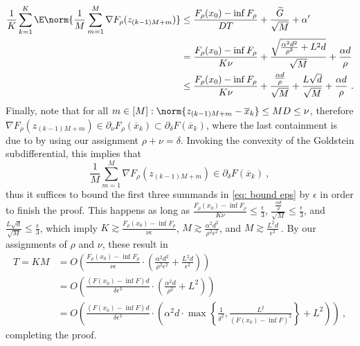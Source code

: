 \begin{align}
\frac{1}{K}\sum_{k=1}^{K}\E\norm{\frac{1}{M}\sum_{m=1}^{M}\nabla F_{\rho}(z_{(k-1)M+m})}
&\leq \frac{ F_\rho(x_0)-\inf F_\rho}{DT}+\frac{\widetilde{G}}{\sqrt{M}}+\alpha'
\nonumber\\
&=\frac{ F_\rho(x_0)-\inf F_\rho}{K\nu}+\frac{\sqrt{\frac{\alpha^2 d^2}{\rho^2}+L^2d}}{\sqrt{M}}+\frac{\alpha d}{\rho}  
\nonumber\\
&\leq
\frac{ F_\rho(x_0)-\inf F_\rho}{K\nu}
+\frac{{\frac{\alpha d}{\rho}}}{\sqrt{M}}
+\frac{L\sqrt{d}}{\sqrt{M}}
+\frac{\alpha d}{\rho}~. \label{eq: bound eps}
\end{align}
Finally, note that for all $m\in[M]:\norm{z_{(k-1)M+m}-\overline{x}_{k}}\leq M D\leq\nu$, therefore 
$\nabla F_{\rho}(z_{(k-1)M+m})\in\partial_\nu F_\rho(\overline{x}_{k})\subset \partial_{\delta}F(\overline{x}_{k})$, where the last containment is due to \citep[Lemma 4]{kornowski2024algorithm} by using our assignment $\rho+\nu= \delta$.
Invoking the convexity of the Goldstein subdifferential, this implies that
\[
\frac{1}{M}\sum_{m=1}^{M}\nabla F_{\rho}(z_{(k-1)M+m})
\in\partial_{\delta}F(\overline{x}_{k})
~,
\]
thus it suffices to bound the first three summands in \eqref{eq: bound eps} by $\epsilon$ in order to finish the proof.
This happens as long as $
\frac{ F_\rho(x_0)-\inf F_\rho}{K\nu}\leq\frac{\epsilon}{3}$, $\frac{{\frac{\alpha d}{\rho}}}{\sqrt{M}}\leq\frac{\epsilon}{3}$, and $\frac{L\sqrt{d}}{\sqrt{M}}\leq\frac{\epsilon}{3}$, which imply $K\gtrsim \frac{ F_\rho(x_0)-\inf F_\rho}{\nu\epsilon}$, $ M\gtrsim \frac{\alpha^2 d^2}{\rho^2\epsilon^2}$, and $M\gtrsim \frac{L^2 d}{\epsilon^2}~$. 
By our assignments of $\rho$ and $\nu$, these  result in
\begin{align*}
T=KM
&=O\left(\frac{ F_\rho(x_0)-\inf F_\rho}{\nu\epsilon}\cdot \left(\frac{\alpha^2 d^2}{\rho^2\epsilon^2}+\frac{L^2 d}{\epsilon^2}\right)\right)
\\
&=O\left(\frac{(F(x_0)-\inf F)d}{\delta\epsilon^3}\cdot \left(\frac{\alpha^2 d}{\rho^2}+L^2\right)\right)
\\
&=O\left(\frac{(F(x_0)-\inf F)d}{\delta\epsilon^3}\cdot \left(\alpha^2 d\cdot\max\left\{\frac{1}{\delta^2},\frac{L^2}{(F(x_0)-\inf F)^2}\right\}+L^2\right)\right)
~,
\end{align*}
completing the proof.









